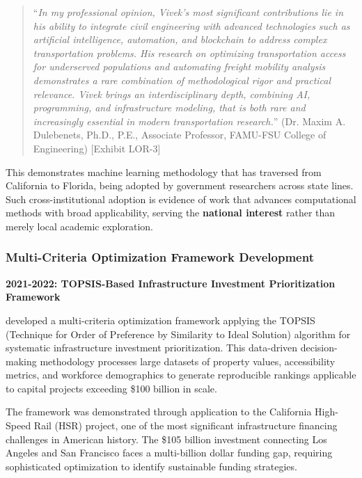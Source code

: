 \begin{quote}
``\textit{In my professional opinion, Vivek's most significant contributions lie in his ability to integrate civil engineering with advanced technologies such as artificial intelligence, automation, and blockchain to address complex transportation problems. His research on optimizing transportation access for underserved populations and automating freight mobility analysis demonstrates a rare combination of methodological rigor and practical relevance. Vivek brings an interdisciplinary depth, combining AI, programming, and infrastructure modeling, that is both rare and increasingly essential in modern transportation research.}'' (Dr. Maxim A. Dulebenets, Ph.D., P.E., Associate Professor, FAMU-FSU College of Engineering) [Exhibit LOR-3]
\end{quote}

This demonstrates machine learning methodology that has traversed from California to Florida, being adopted by government researchers across state lines. Such cross-institutional adoption is evidence of work that advances computational methods with broad applicability, serving the \textbf{national interest} rather than merely local academic exploration.


\subsubsection{Multi-Criteria Optimization Framework Development}
\label{scholar:hsr}

\textbf{2021-2022: TOPSIS-Based Infrastructure Investment Prioritization Framework}

\dr developed a multi-criteria optimization framework applying the TOPSIS (Technique for Order of Preference by Similarity to Ideal Solution) algorithm for systematic infrastructure investment prioritization. This data-driven decision-making methodology processes large datasets of property values, accessibility metrics, and workforce demographics to generate reproducible rankings applicable to capital projects exceeding \$100 billion in scale.

The framework was demonstrated through application to the California High-Speed Rail (HSR) project, one of the most significant infrastructure financing challenges in American history. The \$105 billion investment connecting Los Angeles and San Francisco faces a multi-billion dollar funding gap, requiring sophisticated optimization to identify sustainable funding strategies.

